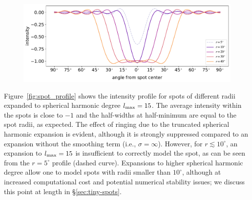 \documentclass[modern]{aastex62}
\begin{document}
\begin{figure}[t!]
    \begin{centering}
        \includegraphics[width=\linewidth]{figures/spot_profile.pdf}
    \end{centering}
\end{figure}

Figure~\ref{fig:spot_profile} shows the intensity profile for spots of
different radii expanded to spherical harmonic degree $l_{\mathrm{max}} = 15$.
%
The average intensity
within the spots is close to $-1$ and the half-widths at half-minimum are
equal to the spot radii, as expected.
The effect of ringing due to the truncated spherical harmonic expansion is
evident, although it is strongly suppressed compared to an expansion
without the smoothing term (i.e., $\sigma = \infty$). However, for
$r \lesssim 10^\circ$, an expansion to $l_{\mathrm{max}} = 15$ is
insufficient to correctly model the spot, as can be seen from the
$r = 5^\circ$ profile (dashed curve). Expansions to higher spherical harmonic
degree allow one to model spots with radii smaller than $10^\circ$, although
at increased computational cost and potential numerical stability issues;
we discuss this point at length in \S\ref{sec:tiny-spots}.
\end{document}
